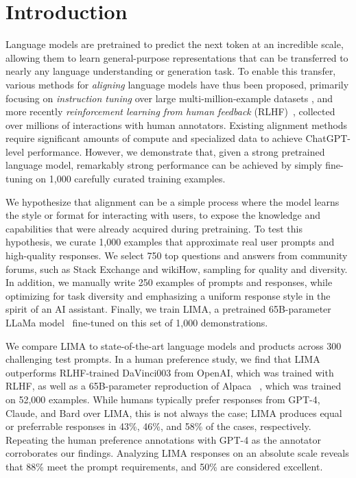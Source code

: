 \section{Introduction}

Language models are pretrained to predict the next token at an incredible scale, allowing them to learn general-purpose representations that can be transferred to nearly any language understanding or generation task. 
To enable this transfer, various methods for \textit{aligning} language models have thus been proposed, primarily focusing on \textit{instruction tuning} \citep{mishra2021natural, weifinetuned, sanh2022multitask} over large multi-million-example datasets \citep{chung2022scaling, beeching2023stackllama, openassistant}, and more recently \textit{reinforcement learning from human feedback} (RLHF)~\citep{bai2022training, ouyang2022training}, collected over millions of interactions with human annotators.
Existing alignment methods require significant amounts of compute and specialized data to achieve ChatGPT-level performance.
However, we demonstrate that, given a strong pretrained language model, remarkably strong performance can be achieved by simply fine-tuning on 1,000 carefully curated training examples.

We hypothesize that alignment can be a simple process where the model learns the style or format for interacting with users, to expose the knowledge and capabilities that were already acquired during pretraining.
To test this hypothesis, we curate 1,000 examples that approximate real user prompts and high-quality responses.
We select 750 top questions and answers from community forums, such as Stack Exchange and wikiHow, sampling for quality and diversity.
In addition, we manually write 250 examples of prompts and responses, while optimizing for task diversity and emphasizing a uniform response style in the spirit of an AI assistant.
Finally, we train LIMA, a pretrained 65B-parameter LLaMa model~\citep{touvron2023llama} fine-tuned on this set of 1,000 demonstrations.

We compare LIMA to state-of-the-art language models and products across 300 challenging test prompts.
In a human preference study, we find that LIMA outperforms RLHF-trained DaVinci003 from OpenAI, which was trained with RLHF, as well as a 65B-parameter reproduction of Alpaca
~\citep{alpaca}, which was trained on 52,000 examples.
While humans typically prefer responses from GPT-4, Claude, and Bard over LIMA, this is not always the case; LIMA produces equal or preferrable responses in 43\%, 46\%, and 58\% of the cases, respectively.
Repeating the human preference annotations with GPT-4 as the annotator corroborates our findings.
Analyzing LIMA responses on an absolute scale reveals that 88\% meet the prompt requirements, and 50\% are considered excellent.

